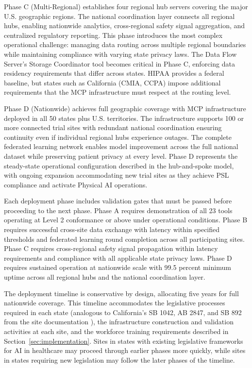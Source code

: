 Phase C (Multi-Regional) establishes four regional hub servers covering the
major U.S. geographic regions. The national coordination layer connects all
regional hubs, enabling nationwide analytics, cross-regional safety signal
aggregation, and centralized regulatory reporting. This phase introduces the
most complex operational challenge: managing data routing across multiple
regional boundaries while maintaining compliance with varying state privacy
laws. The Data Flow Server's Storage Coordinator tool becomes critical in
Phase C, enforcing data residency requirements that differ across states. HIPAA
\cite{hipaa} provides a federal baseline, but states such as California (CMIA,
CCPA) impose additional requirements that the MCP infrastructure must respect
at the routing level.

Phase D (Nationwide) achieves full geographic coverage with MCP infrastructure
deployed in all 50 states plus U.S. territories. The infrastructure supports
100 or more connected trial sites with redundant national coordination ensuring
continuity even if individual regional hubs experience outages. The complete
federated learning network enables model improvement across the full national
dataset while preserving patient privacy at every level. Phase D represents the
steady-state operational configuration described in the hub-and-spoke model,
with ongoing expansion accommodating new trial sites as they achieve PSL
compliance and activate Physical AI operations.

Each deployment phase includes validation gates that must be passed before
proceeding to the next phase. Phase A requires demonstration of all 23 tools
operating at Level 2 conformance or above under operational conditions. Phase B
requires successful cross-site data exchange with latency within specified
thresholds and federated learning round completion across all participating
sites. Phase C requires cross-regional safety signal propagation within latency
requirements and compliance with all applicable state privacy laws. Phase D
requires sustained operation at nationwide scale with 99.5 percent minimum
uptime across all regional hubs and the national coordination layer.

The deployment timeline is conservative by design, allocating five years for
full nationwide coverage. This timeline accommodates the legislative processes
required in each state (analogous to California's SB 1042, AB 2847, and SB 892
from the site documentation \cite{site-docs}), the infrastructure construction
and validation activities at each site, and the workforce training requirements
described in Section~\ref{sec:implementation}. Sites in states with existing
legislative frameworks for AI in healthcare may proceed through earlier phases
more quickly, while sites in states requiring new legislation may follow the
later phases of the timeline.

